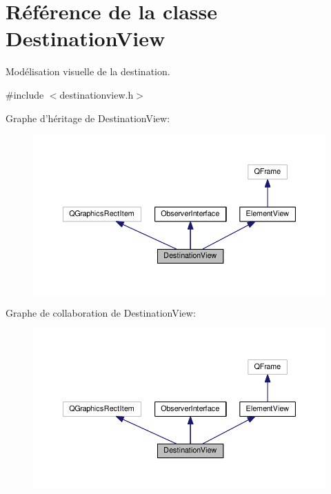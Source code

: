 \hypertarget{classDestinationView}{\section{Référence de la classe Destination\+View}
\label{classDestinationView}
}


Modélisation visuelle de la destination.  




{\ttfamily \#include $<$destinationview.\+h$>$}



Graphe d'héritage de Destination\+View\+:\nopagebreak
\begin{figure}[H]
\begin{center}
\leavevmode
\includegraphics[width=350pt]{d6/d79/classDestinationView__inherit__graph}
\end{center}
\end{figure}


Graphe de collaboration de Destination\+View\+:\nopagebreak
\begin{figure}[H]
\begin{center}
\leavevmode
\includegraphics[width=350pt]{d0/d46/classDestinationView__coll__graph}
\end{center}
\end{figure}
